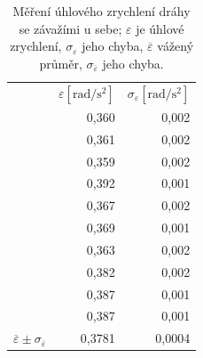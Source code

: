 \documentclass[english]{article}
\newcommand{\unit}[1]{\mathrm{#1}}
\begin{document}
\begin{table}[h]
{}
\hfill
\parbox{.45\linewidth}{
\centering
      \begin{tabular}{|r|r|r|}
  \cline{2-3}    \multicolumn{1}{r|}{} & $\varepsilon \unit{[ rad/s^2]}$ & $\sigma_{\varepsilon}\unit{ [rad/s^2]}$ \bigstrut\\
  \cline{2-3}    \multicolumn{1}{r|}{} & 0,360 & 0,002 \bigstrut\\
  \cline{2-3}    \multicolumn{1}{r|}{} & 0,361 & 0,002 \bigstrut\\
  \cline{2-3}    \multicolumn{1}{r|}{} & 0,359 & 0,002 \bigstrut\\
  \cline{2-3}    \multicolumn{1}{r|}{} & 0,392 & 0,001 \bigstrut\\
  \cline{2-3}    \multicolumn{1}{r|}{} & 0,367 & 0,002 \bigstrut\\
  \cline{2-3}    \multicolumn{1}{r|}{} & 0,369 & 0,001 \bigstrut\\
  \cline{2-3}    \multicolumn{1}{r|}{} & 0,363 & 0,002 \bigstrut\\
  \cline{2-3}    \multicolumn{1}{r|}{} & 0,382 & 0,002 \bigstrut\\
  \cline{2-3}    \multicolumn{1}{r|}{} & 0,387 & 0,001 \bigstrut\\
  \cline{2-3}    \multicolumn{1}{r|}{} & 0,387 & 0,001 \bigstrut\\
      \hline
      $\overline{\varepsilon} \pm \sigma_{\overline{\varepsilon}} $ & 0,3781 & 0,0004 \bigstrut\\
      \hline
      \end{tabular}%
  

      
   
  \caption{Měření úhlového zrychlení dráhy se závažími u sebe; $\varepsilon$ je úhlové zrychlení, $\sigma_{\varepsilon}$ jeho chyba, $\overline{\varepsilon}$ vážený průměr, $\sigma_{\overline{\varepsilon}}$ jeho chyba.}
    \label{tab:zzmh_zavazi_usebe}%

}

\end{table}
\end{document}
